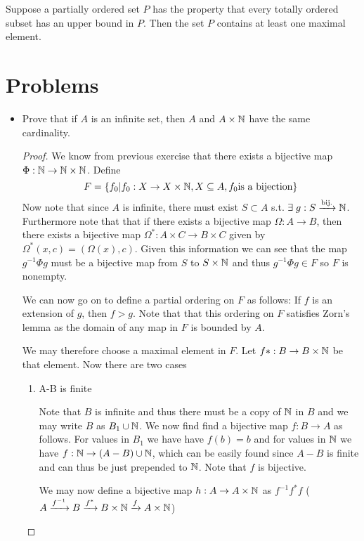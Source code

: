 

\begin{lemma}
 Suppose a partially ordered set $P$ has the property that every totally ordered subset has an upper bound in $P$. Then the set $P$ contains at least one maximal element.
\section{Problems}
\begin{itemize}
\item Prove that if $A$ is an infinite set, then $A$ and $A\times \mathbb{N}$ have the same cardinality.
\begin{proof}
We know from previous exercise that there exists a bijective map $\Phi: \mathbb{N}\to\mathbb{N}\times\mathbb{N}$. Define
\[ F = \{ f_0 | f_0:X\to X\times\mathbb{N}, X\subseteq A, f_0 \text{is a bijection}\}\]
Now note that since $A$ is infinite, there must exist $S\subset A$ s.t. $\exists\; g:S\xrightarrow{\text{bij.}}\mathbb{N}$. 
Furthermore note that that if there exists a bijective map  $\Omega: A\to B$, then there exists a bijective map $\Omega^*:A\times C\to B\times C$ given by 
$\Omega^*(x,c)=(\Omega(x),c)$. Given this information we can see that the map $g^{-1}\Phi g$ must be a bijective map from $S$ to $S\times \mathbb{N}$ and thus  $g^{-1}\Phi g\in F$ so $F$ is nonempty.

We can now go on to define a partial ordering on $F$ as follows: If $f$ is an extension of $g$, then $f>g$. Note that that this ordering on $F$ satisfies Zorn's lemma as the domain of any map in $F$ is bounded by $A$.

We may therefore choose a maximal element in $F$. Let  $f*: B\to B\times \mathbb{N}$ be that element. Now there are two cases
\begin{enumerate}
\item A-B is finite\par
Note that $B$ is infinite and thus there must be a copy of $\mathbb{N}$ in $B$ and we may write $B$ as $B_1\cup \mathbb{N}$.
We now find find a bijective map $f: B\to A$ as follows. For values in $B_1$ we have have $f(b)=b$ and for values in $\mathbb{N}$ we have $f: \mathbb{N}\to (A-B)\cup\mathbb{N}$, which can be easily found since $A-B$ is finite and can thus be just prepended to $\mathbb{N}$. Note that $f$ is bijective.

We may now define a bijective map $h: A\to A\times \mathbb{N}$ as $f^{-1}f^*f$
 ($A\xrightarrow{f^{-1}}B\xrightarrow{f^*}B\times\mathbb{N}\xrightarrow{f}A\times\mathbb{N}$)

\end{enumerate}

\end{proof}
\end{itemize}
\end{lemma}

